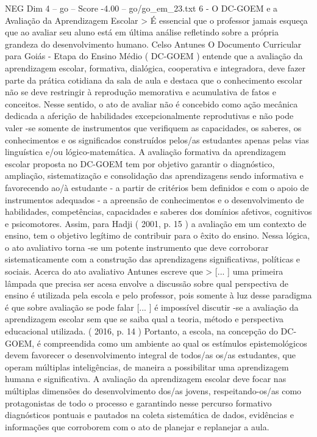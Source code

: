 \begin{textsample}{NEG Dim 4 – go – Score -4.00 – go/go\_em\_23.txt}  \label{ex:f4_neg_221}
6 - O DC-GOEM e a Avaliação da Aprendizagem Escolar > É essencial que o professor jamais esqueça que ao avaliar seu aluno está em última análise refletindo sobre a própria grandeza do desenvolvimento humano.
Celso Antunes O Documento Curricular para Goiás - Etapa do Ensino Médio ( DC-GOEM ) entende que a avaliação da aprendizagem escolar, formativa, dialógica, cooperativa e integradora, deve fazer parte da prática cotidiana da sala de aula e destaca que o conhecimento escolar não se deve restringir à reprodução memorativa e acumulativa de fatos e conceitos.
Nesse sentido, o ato de avaliar não é concebido como ação mecânica dedicada a aferição de habilidades excepcionalmente reprodutivas e não pode valer -se somente de instrumentos que verifiquem as capacidades, os saberes, os conhecimentos e os significados construídos pelos/as estudantes apenas pelas vias linguística e/ou lógico-matemática.
A avaliação formativa da aprendizagem escolar proposta no DC-GOEM tem por objetivo garantir o diagnóstico, ampliação, sistematização e consolidação das aprendizagens sendo informativa e favorecendo ao/à estudante - a partir de critérios bem definidos e com o apoio de instrumentos adequados - a apreensão de conhecimentos e o desenvolvimento de habilidades, competências, capacidades e saberes dos domínios afetivos, cognitivos e psicomotores.
Assim, para Hadji ( 2001, p. 15 ) a avaliação em um contexto de ensino, tem o objetivo legítimo de contribuir para o êxito do ensino.
Nessa lógica, o ato avaliativo torna -se um potente instrumento que deve corroborar sistematicamente com a construção das aprendizagens significativas, políticas e sociais.
Acerca do ato avaliativo Antunes escreve que > [... ] uma primeira lâmpada que precisa ser acesa envolve a discussão sobre qual perspectiva de ensino é utilizada pela escola e pelo professor, pois somente à luz desse paradigma é que sobre avaliação se pode falar [... ] é impossível discutir -se a avaliação da aprendizagem escolar sem que se saiba qual a teoria, método e perspectiva educacional utilizada. ( 2016, p. 14 ) Portanto, a escola, na concepção do DC-GOEM, é compreendida como um ambiente ao qual os estímulos epistemológicos devem favorecer o desenvolvimento integral de todos/as os/as estudantes, que operam múltiplas inteligências, de maneira a possibilitar uma aprendizagem humana e significativa.
A avaliação da aprendizagem escolar deve focar nas múltiplas dimensões do desenvolvimento dos/as jovens, respeitando-os/as como protagonistas de todo o processo e garantindo nesse percurso formativo diagnósticos pontuais e pautados na coleta sistemática de dados, evidências e informações que corroborem com o ato de planejar e replanejar a aula.

\end{textsample}
